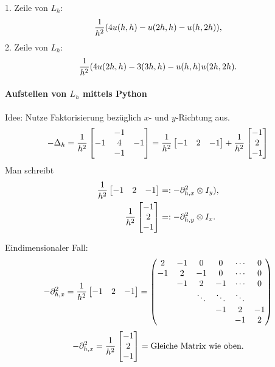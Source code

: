 1. Zeile von $L_h$:
\[ \frac{1}{h^2} ( 4u(h,h) - u(2h,h) - u(h,2h)), \]
2. Zeile von $L_h$:
\[ \frac{1}{h^2} ( 4u(2h,h) - 3(3h,h)- u(h,h)  u(2h,2h). \]

\paragraph{Aufstellen von $L_h$ mittels Python}
Idee: Nutze Faktorisierung bezüglich $x$- und $y$-Richtung aus.
\[ -\Delta_h = \frac{1}{h^2}
  \begin{bmatrix}
    & -1 \\
    -1 & 4 & -1 \\
    & -1
  \end{bmatrix}
  = \frac{1}{h^2} \begin{bmatrix} -1 & 2 & -1 \end{bmatrix}
  + \frac{1}{h^2} \begin{bmatrix} -1 \\ 2 \\ -1 \end{bmatrix}
\]
Man schreibt
\begin{align*}
  \frac{1}{h^2} \begin{bmatrix} -1 & 2 & -1 \end{bmatrix}
  &=: -\partial_{h,x}^2 \otimes I_y), \\
  \frac{1}{h^2} \begin{bmatrix} -1 \\ 2 \\ -1 \end{bmatrix}
  &=: -\partial_{h,y}^2 \otimes I_x.
\end{align*}

  
Eindimensionaler Fall:
\[ - \partial_{h,x}^2 = \frac{1}{h^2}
  \begin{bmatrix} -1 & 2 & -1 \end{bmatrix} =
  \begin{pmatrix}
    2 & -1 & 0 & 0 & \cdots & 0 \\
    -1 & 2 & -1 & 0 & \cdots & 0\\
    & -1 & 2 & -1 & \cdots & 0 \\
    & & \ddots & \ddots & \ddots \\
    & & & -1 & 2 & -1 \\
    & & & & -1 & 2
  \end{pmatrix} \]
\[ - \partial_{h,x}^2 = \frac{1}{h^2}
  \begin{bmatrix} -1 \\ 2 \\ -1 \end{bmatrix} =
  \text{Gleiche Matrix wie oben.}\]

